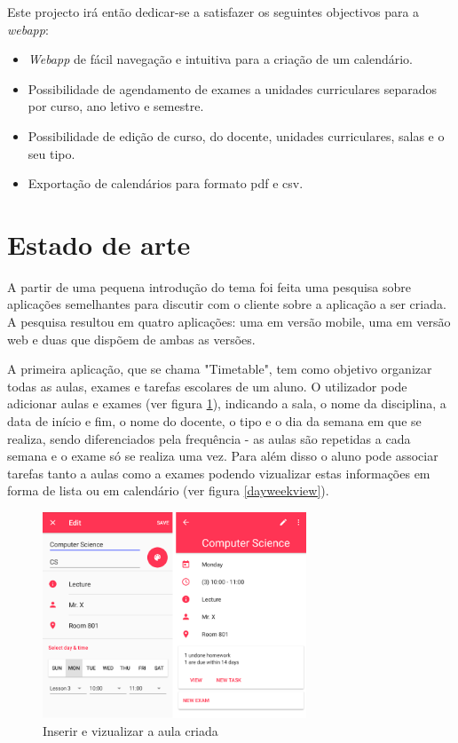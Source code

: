 \documentclass[11pt, twoside]{report}
\begin{document}
	Este projecto irá então dedicar-se a satisfazer os seguintes objectivos para a \textit{webapp}: 
	\begin{itemize} 
		\item \textit{Webapp} de fácil navegação e intuitiva para a criação de um calendário. 
		\item Possibilidade de agendamento de exames a unidades curriculares separados por curso, ano letivo e semestre.   
		\item Possibilidade de edição de curso, do docente, unidades curriculares, salas e o seu tipo. 
		\item Exportação de calendários para formato pdf e csv. 
	\end{itemize} 
	\section{Estado de arte}
	\label{estadodearte}
	
	A partir de uma pequena introdução do tema foi feita uma pesquisa sobre aplicações semelhantes para discutir com o cliente sobre a aplicação a ser criada. A pesquisa resultou em quatro aplicações: uma em versão mobile, uma em versão web e duas que dispõem de ambas as versões.
	
	A primeira aplicação, que se chama "Timetable", tem como objetivo organizar todas as aulas, exames e tarefas escolares de um aluno. O utilizador pode adicionar aulas e exames (ver figura \ref{inserirvizualizaraula}), indicando a sala, o nome da disciplina, a data de início e fim, o nome do docente, o tipo e o dia da semana em que se realiza, sendo diferenciados pela frequência - as aulas são repetidas a cada semana e o exame só se realiza uma vez. Para além disso o aluno pode associar tarefas tanto a aulas como a exames podendo vizualizar estas informações em forma de lista ou em calendário (ver figura \ref{dayweekview}).
	\begin{figure}[H] 
		\centering 
		\includegraphics[width=0.7\textwidth,height=0.7\textheight,keepaspectratio]{image/estadodearte/inserirevizualizar}
		\caption{Inserir e vizualizar a aula criada}
		\label{inserirvizualizaraula}
	\end{figure}
	
\end{document}
